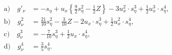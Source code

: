 
\[
\tag{8.}
\begin{aligned}
\text{a)}\quad g'_\nu&=-s_\eta+u_x\left\{\frac92s_\eta^2-\frac12Z\right\}-3u_x^2\cdot s_\eta^3+\frac12u_x^3\cdot s_\eta^4,\\
\text{b)}\quad g_\nu^2&=\frac{21}{10}s_\eta^2-\frac3{10}Z-2u_x\cdot s_\eta^3+\frac12u_x^2\cdot s_\eta^4,\\
\text{c)}\quad g_\nu^3&=-\frac7{10}s_\eta^3+\frac12u_x\cdot s_\eta^4,\\
\text{d)}\quad g_\nu^4&=\frac35s_\eta^4.
\end{aligned}
\]
